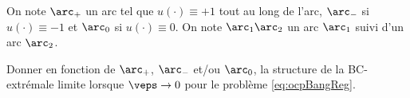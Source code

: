 \begin{myremark}
    On note $\arc_+$ un arc tel que $u(\cdot) \equiv +1$ tout au long de l'arc, $\arc_-$ si $u(\cdot) \equiv -1$ et $\arc_0$ si $u(\cdot) \equiv 0$.
    On note $\arc_1 \arc_2$ un arc $\arc_1$ suivi d'un arc $\arc_2$.
\end{myremark}

\begin{myQuestion}
    \label{question:continuation}
    Donner en fonction de $\arc_+$, $\arc_-$ et/ou $\arc_0$, la structure de la BC-extr\'emale limite lorsque $\veps \to 0$ pour le probl\`eme
    \eqref{eq:ocpBangReg}.
\end{myQuestion}
